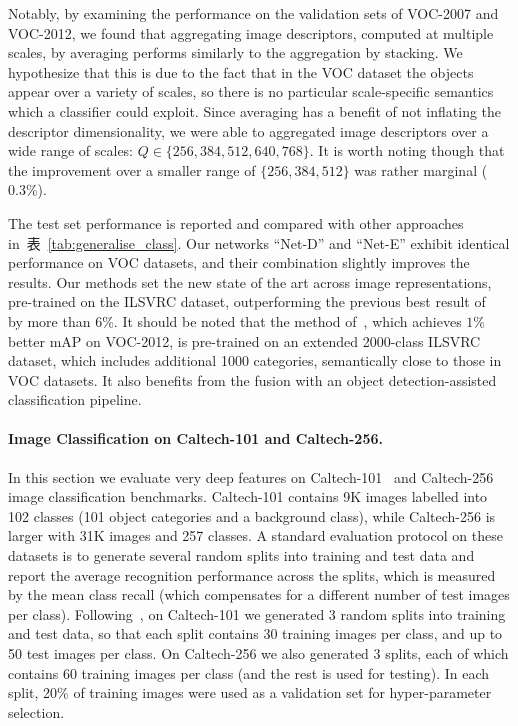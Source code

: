 \documentclass{article} %
\newcommand{\tblref}[1]{表~\ref{#1}}
\begin{document}
Notably, by examining the performance on the validation sets of \mbox{VOC-2007} and VOC-2012, we found that aggregating image descriptors, computed at multiple scales, by averaging performs similarly to the aggregation by stacking.
We hypothesize that this is due to the fact that in the VOC dataset the objects appear over a variety of scales, so there is no particular scale-specific semantics which a classifier could exploit.
Since averaging has a benefit of not inflating the descriptor dimensionality, we were able to aggregated image descriptors over a wide range of scales: $Q \in \{256,384,512,640,768\}$. It is worth noting though that the improvement over a smaller range of $\{256,384,512\}$ was rather marginal ($0.3\%$).

The test set performance is reported and compared with other approaches in~\tblref{tab:generalise_class}. Our networks ``Net-D'' and ``Net-E'' exhibit identical performance on VOC datasets, and their combination slightly improves the results. Our methods set the new state of the art across image representations, pre-trained on the ILSVRC dataset, outperforming the previous best result of~\citet{Chatfield14} by more than $6\%$. It should be noted that the method of~\citet{Wei14}, which achieves $1\%$ better mAP on VOC-2012, is pre-trained on an extended 2000-class ILSVRC dataset, which includes additional 1000 categories, semantically close to those in VOC datasets. It also benefits from the fusion with an object detection-assisted classification pipeline.

\paragraph{Image Classification on Caltech-101 and Caltech-256.}
In this section we evaluate very deep features on \mbox{Caltech-101}~\citep{FeiFei04} and \mbox{Caltech-256}~\citep{Griffin07} image classification benchmarks. Caltech-101 contains 9K images labelled into 102 classes (101 object categories and a background class), while Caltech-256 is larger with 31K images and 257 classes. 
A standard evaluation protocol on these datasets is to generate several random splits into training and test data and report the average recognition performance across the splits, which is measured by the mean class recall (which compensates for a different number of test images per class).
Following~\citet{Chatfield14,Zeiler13,He14}, on Caltech-101 we generated 3 random splits into training and test data, so that each split contains 30 training images per class, and up to 50 test images per class. On Caltech-256 we also generated 3 splits, each of which contains 60 training images per class (and the rest is used for testing). In each split, 20\% of training images were used as a validation set for hyper-parameter selection.
\end{document}

